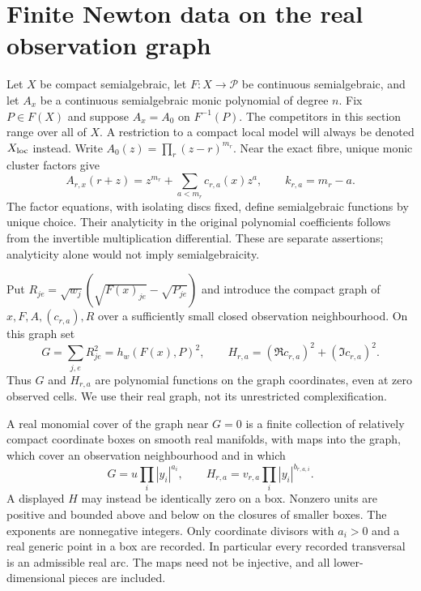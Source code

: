 \section{Finite Newton data on the real observation graph}
\label{sec:finite-newton-v95}
Let $X$ be compact semialgebraic, let $F:X\to\mathcal P$ be continuous
semialgebraic, and let $A_x$ be a continuous semialgebraic monic polynomial
of degree $n$. Fix $P\in F(X)$ and suppose $A_x=A_0$ on $F^{-1}(P)$.
The competitors in this section range over all of $X$. A restriction to a
compact local model will always be denoted $X_{\rm loc}$ instead.
Write $A_0(z)=\prod_r(z-r)^{m_r}$. Near the exact fibre, unique monic
cluster factors give
\[
 A_{r,x}(r+z)=z^{m_r}+\sum_{a<m_r}c_{r,a}(x)z^a,\qquad k_{r,a}=m_r-a.
\]
The factor equations, with isolating discs fixed, define semialgebraic
functions by unique choice. Their analyticity in the original polynomial
coefficients follows from the invertible multiplication differential.
These are separate assertions; analyticity alone would not imply
semialgebraicity.

Put $R_{je}=\sqrt{w_j}(\sqrt{F(x)_{je}}-\sqrt{P_{je}})$ and introduce the
compact graph of $x,F,A,(c_{r,a}),R$ over a sufficiently small closed
observation neighbourhood. On this graph set
\begin{equation}\label{eq:ideals-v95}
 G=\sum_{j,e}R_{je}^2=h_w(F(x),P)^2,
 \qquad H_{r,a}=(\Re c_{r,a})^2+(\Im c_{r,a})^2.
\end{equation}
Thus $G$ and $H_{r,a}$ are polynomial functions on the graph coordinates,
even at zero observed cells. We use their real graph, not its unrestricted
complexification.

\begin{definition}\label{def:real-data-v95}
A real monomial cover of the graph near $G=0$ is a finite collection of
relatively compact coordinate boxes on smooth real manifolds, with maps
into the graph, which cover an observation neighbourhood and in which
\begin{equation}\label{eq:monomial-data-v95}
 G=u\prod_i|y_i|^{a_i},\qquad
 H_{r,a}=v_{r,a}\prod_i|y_i|^{b_{r,a,i}}.
\end{equation}
A displayed $H$ may instead be identically zero on a box. Nonzero units
are positive and bounded above and below on the closures of smaller
boxes. The exponents are nonnegative integers. Only coordinate divisors
with $a_i>0$ and a real generic point in a box are recorded. In
particular every recorded transversal is an admissible real arc. The
maps need not be injective, and all lower-dimensional pieces are included.
\end{definition}

